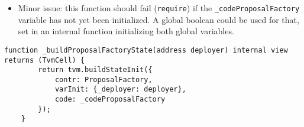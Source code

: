 \begin{itemize}
\item Minor issue: this function should fail ({\tt require}) if the
  {\tt \_codeProposalFactory} variable has not yet been initialized. A global
  boolean could be used for that, set in an internal function
  initializing both global variables.
\end{itemize}

\begin{lstlisting}[firstnumber=14]
    function _buildProposalFactoryState(address deployer) internal view returns (TvmCell) {
        return tvm.buildStateInit({
            contr: ProposalFactory,
            varInit: {_deployer: deployer},
            code: _codeProposalFactory
        });
    }
\end{lstlisting}
